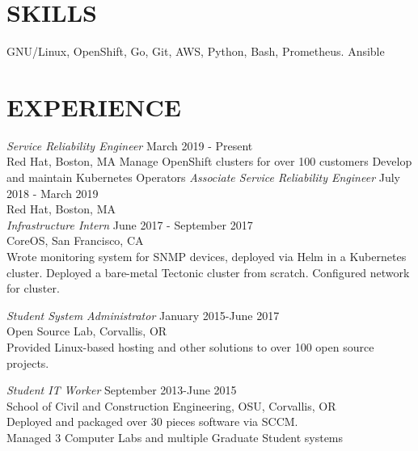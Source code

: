 \documentclass[line,margin]{res}
\begin{document}
\address{fahlmantaylor@gmail.com}
\address{github.com/fahlmant, linkedin.com/in/taylorfahlman}
\begin{resume}

                    
\section{SKILLS}
                    GNU/Linux, OpenShift, Go, Git, AWS, Python, Bash, Prometheus. Ansible
                    
\section{EXPERIENCE}
                    {\sl Service Reliability Engineer} \hfill March 2019 - Present\\
                    Red Hat,
                    Boston, MA
                    Manage OpenShift clusters for over 100 customers
                    Develop and maintain Kubernetes Operators
                    {\sl Associate Service Reliability Engineer} \hfill July 2018 - March 2019\\
                    Red Hat,
                    Boston, MA\\

                    {\sl Infrastructure Intern} \hfill June 2017 - September 2017\\
                    CoreOS,
                    San Francisco, CA\\
                    Wrote monitoring system for SNMP devices, deployed via Helm in a Kubernetes cluster.
                    Deployed a bare-metal Tectonic cluster from scratch. Configured network for cluster.

                    {\sl Student System Administrator} \hfill January 2015-June 2017\\
                    Open Source Lab, 
                    Corvallis, OR\\
                    Provided Linux-based hosting and other solutions to over 100 open source projects.

                    {\sl Student IT Worker} \hfill September 2013-June 2015 \\
                    School of Civil and Construction Engineering, OSU, 
                    Corvallis, OR\\ 
                    Deployed and packaged over 30 pieces software via SCCM.\\
                    Managed 3 Computer Labs and multiple Graduate Student systems


\end{resume}
\end{document}
